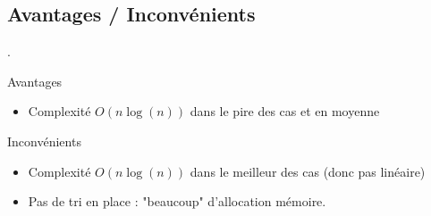 \documentclass{../cours}
\begin{document}
\subsection{Avantages / Inconvénients}

.

\begin{minipage}[t]{0.49 \textwidth}
Avantages

\begin{itemize}
\item Complexité $O(n \log(n))$ dans le pire des cas et en moyenne
\end{itemize}

\end{minipage}
\begin{minipage}[t]{0.49 \textwidth}
Inconvénients

\begin{itemize}
\item Complexité $O(n \log(n))$ dans le meilleur des cas (donc pas linéaire)
\item Pas de tri en place : "beaucoup" d'allocation mémoire.
\end{itemize}
\end{minipage}
\end{document}
